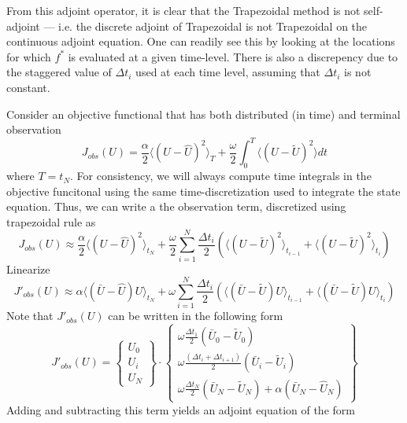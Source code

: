\documentclass[10pt]{article}
\begin{document}
From this adjoint operator, it is clear that the Trapezoidal method is not
self-adjoint --- i.e. the discrete adjoint of Trapezoidal is not Trapezoidal
on the continuous adjoint equation.  One can readily see this by looking at
the locations for which $f^*$ is evaluated at a given time-level.  There is
also a discrepency due to the staggered value of $\Delta t_i$ used at each
time level, assuming that $\Delta t_i$ is not constant.

Consider an objective functional that has both distributed (in time) and
terminal observation
\begin{equation}
J_{obs}(U) = \frac{\alpha}{2} \langle (U-\hat U)^2 \rangle_{T} +
       \frac{\omega}{2} \int_0^T \langle (U-\tilde U)^2 \rangle dt
\end{equation}
where $T = t_N$.  For consistency, we will always compute time integrals in
the objective funcitonal using the same time-discretization used to integrate
the state equation.  Thus, we can write a the observation term, discretized
using trapezoidal rule as
\begin{equation} \label{e:objective}
J_{obs}(U) \approx \frac{\alpha}{2} \langle (U-\hat U)^2 \rangle_{t_N} +
\frac{\omega}{2} \sum_{i=1}^{N} \frac{\Delta t_i}{2} 
\left( \langle (U-\tilde U)^2 \rangle_{t_{i-1}} +
\langle (U-\tilde U)^2 \rangle_{t_i} \right) 
\end{equation}
Linearize
\begin{equation}
J'_{obs}(U) \approx \alpha \langle (\bar U-\hat U) U \rangle_{t_N} +
\omega \sum_{i=1}^{N} \frac{\Delta t_i}{2} 
\left( \langle (\bar U-\tilde U) U \rangle_{t_{i-1}} +
\langle (\bar U-\tilde U) U \rangle_{t_i} \right)
\end{equation}
Note that $J'_{obs}(U)$ can be written in the following form
\begin{equation}
J'_{obs}(U) = 
\left\{\begin{array}{c} U_0 \\ U_i \\ U_N \end{array}\right\}
\cdot
\left\{\begin{array}{c} 
\omega\frac{\Delta t_1}{2} (\bar U_0 - \tilde U_0)  \\ 
\omega\frac{(\Delta t_i+\Delta t_{i+1})}{2} (\bar U_i - \tilde U_i) \\ 
\omega\frac{\Delta t_N}{2} (\bar U_N - \tilde U_N) + 
\alpha (\bar U_N - \hat U_N)
\end{array}\right\}
\end{equation}
Adding and subtracting this term yields an adjoint equation of the form
\end{document}
